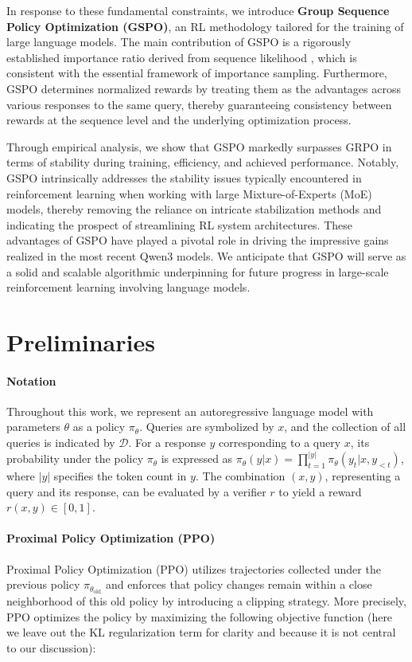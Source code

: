 In response to these fundamental constraints, we introduce \textbf{Group Sequence Policy Optimization (GSPO)}, an RL methodology tailored for the training of large language models. The main contribution of GSPO is a rigorously established importance ratio derived from sequence likelihood \citep{click}, which is consistent with the essential framework of importance sampling. Furthermore, GSPO determines normalized rewards by treating them as the advantages across various responses to the same query, thereby guaranteeing consistency between rewards at the sequence level and the underlying optimization process.

Through empirical analysis, we show that GSPO markedly surpasses GRPO in terms of stability during training, efficiency, and achieved performance. Notably, GSPO intrinsically addresses the stability issues typically encountered in reinforcement learning when working with large Mixture-of-Experts (MoE) models, thereby removing the reliance on intricate stabilization methods and indicating the prospect of streamlining RL system architectures. These advantages of GSPO have played a pivotal role in driving the impressive gains realized in the most recent Qwen3 models. We anticipate that GSPO will serve as a solid and scalable algorithmic underpinning for future progress in large-scale reinforcement learning involving language models.

\section{Preliminaries}

\paragraph{Notation}
Throughout this work, we represent an autoregressive language model with parameters $\theta$ as a policy $\pi_\theta$. Queries are symbolized by $x$, and the collection of all queries is indicated by $\mathcal{D}$. For a response $y$ corresponding to a query $x$, its probability under the policy $\pi_\theta$ is expressed as $\pi_\theta (y | x)=\prod_{t=1}^{|y|} \pi_\theta (y_t | x, y_{<t} )$, where $|y|$ specifies the token count in $y$. The combination $(x, y)$, representing a query and its response, can be evaluated by a verifier $r$ to yield a reward $r(x, y) \in [ 0, 1 ]$.

\paragraph{Proximal Policy Optimization (PPO)} Proximal Policy Optimization (PPO) \citep{ppo} utilizes trajectories collected under the previous policy $\pi_{\theta_\text{old}}$ and enforces that policy changes remain within a close neighborhood of this old policy by introducing a clipping strategy. More precisely, PPO optimizes the policy by maximizing the following objective function (here we leave out the KL regularization term for clarity and because it is not central to our discussion):

